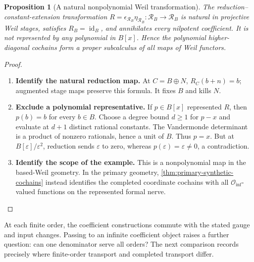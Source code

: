 \documentclass[11pt,a4paper]{article}
\numberwithin{algorithm}{section}
\numberwithin{equation}{section}
\newtheorem{proposition}[proposition]{Proposition}
\theoremstyle{definition}
\theoremstyle{remark}
\theoremstyle{plain}
\newcommand{\id}{\operatorname{id}}
\newcommand{\eps}{\varepsilon}
\newcommand{\Rline}{\mathcal R_B}
\theoremstyle{definition}
\theoremstyle{plain}
\begin{document}
\begin{proposition}[A natural nonpolynomial Weil transformation]
\label{prop:nonpolynomial-reduction}\label{rem:algebraic-vs-full}
The reduction--constant-extension transformation
$R=\epsilon_{\Rline}\eta_{\Rline}:\Rline\to\Rline$
is natural in projective Weil stages, satisfies $R_B=\id_B$,
and annihilates every nilpotent coefficient.  It is not represented
by any polynomial in $B[x]$.  Hence the polynomial higher-diagonal
cochains form a proper subcalculus of all maps of Weil functors.
\end{proposition}
\begin{proof}\leavevmode
\begin{enumerate}[leftmargin=*,align=left]
\item \textbf{Identify the natural reduction map.}
At $C=B\oplus N$, $R_C(b+n)=b$; augmented stage maps preserve
this formula. It fixes $B$ and kills $N$.

\item \textbf{Exclude a polynomial representative.}
If $p\in B[x]$ represented $R$, then $p(b)=b$ for every $b\in B$.
Choose a degree bound $d\ge1$ for $p-x$ and evaluate at $d+1$
distinct rational constants. The Vandermonde determinant
is a product of nonzero rationals, hence a unit of $B$.
Thus $p=x$. But at $B[\eps]/\eps^2$, reduction sends $\eps$ to
zero, whereas $p(\eps)=\eps\ne0$, a contradiction.

\item \textbf{Identify the scope of the example.}
This is a nonpolynomial map in the based-Weil geometry.
In the primary geometry, \cref{thm:primary-synthetic-cochains}
instead identifies the completed coordinate cochains with all
$\mathcal O_{\mathrm{inf}}$-valued functions on the represented
formal nerve.
\end{enumerate}
\end{proof}

At each finite order, the coefficient constructions commute with
the stated gauge and input changes. Passing to an infinite
coefficient object raises a further question: can one denominator
serve all orders? The next comparison records precisely where
finite-order transport and completed transport differ.
\end{document}

